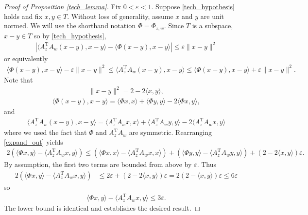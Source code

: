 \documentclass[11pt]{article}
\renewcommand{\epsilon}{\varepsilon}
\renewcommand{\top}{{\mathrm{T}}}
\theoremstyle{remark}
\begin{document}
\begin{proof}[Proof of Proposition \ref{tech_lemma}]
Fix $0 < \epsilon < 1$. Suppose \eqref{tech_hypothesis} holds and fix $x,y \in T$. Without loss of generality, assume $x$ and $y$ are unit normed. We will use the shorthand notation $\Phi = \Phi_{z,w}$. Since $T$ is a subspace, $x - y \in T$ so by \eqref{tech_hypothesis}, \begin{align*}
\left|\langle  A_z^\top A_w (x - y), x-y\rangle - \langle \Phi (x-y), x-y\rangle\right| \leqslant \epsilon\|x-y\|^2
\end{align*} or equivalently \begin{align}
\langle \Phi (x-y), x-y\rangle - \epsilon \|x-y\|^2 \leqslant \langle  A_z^\top A_w(x - y), x-y\rangle  \leqslant \langle \Phi (x-y), x-y\rangle + \epsilon \|x-y\|^2. \label{expand_out}
\end{align} Note that \begin{align*}
\|x-y\|^2 = 2 - 2\langle x,y\rangle,
\end{align*} \begin{align*}
\langle \Phi (x-y), x-y\rangle = \langle \Phi x,x\rangle + \langle \Phi y,y\rangle - 2\langle \Phi x,y\rangle,
\end{align*} and \begin{align*}
\langle  A_z^\top A_w (x - y), x-y\rangle = \langle A_z^\top A_w x,  x\rangle + \langle A_z^\top A_w y, y\rangle - 2 \langle A_z^\top A_w x, y\rangle
\end{align*} where we used the fact that $\Phi$ and $A_z^\top A_w$ are symmetric. Rearranging \eqref{expand_out} yields \begin{align*}
2 \left(\langle \Phi x,y \rangle - \langle A_z^\top A_w x, y \rangle\right) \leqslant \left(\langle \Phi x, x\rangle - \langle  A_z^\top A_w x ,  x\rangle\right) + \left(\langle \Phi  y, y\rangle - \langle  A_z^\top A_w y,  y\rangle\right) + (2 - 2\langle x,y \rangle)\epsilon.
\end{align*} By assumption, the first two terms are bounded from above by $\epsilon$. Thus \begin{align*}
2 \left(\langle \Phi x,y \rangle - \langle A_z^\top A_w x,  y \rangle\right) & \leqslant 2 \epsilon + (2 - 2\langle x,y\rangle)\epsilon  = 2(2 - \langle x,y \rangle)\epsilon \leqslant 6 \epsilon
\end{align*} so \begin{align*}
\langle \Phi x,y \rangle - \langle A_z^\top A_w x, y \rangle \leqslant 3 \epsilon.
\end{align*} The lower bound is identical and establishes the desired result.
\end{proof}
\end{document}
